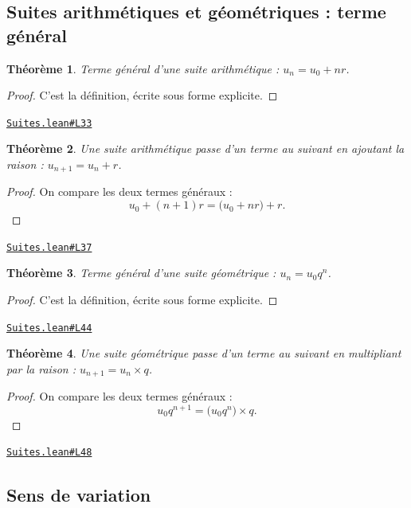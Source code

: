 \documentclass[11pt,a4paper]{article}
\theoremstyle{definition}
\theoremstyle{plain}
\newtheorem{theoreme}{Théorème}
\newcommand{\source}[2]{\par\smallskip\noindent\hfill{\footnotesize\href{#1}{\texttt{#2}}}\par\smallskip}
\begin{document}
\subsection{Suites arithmétiques et géométriques : terme général}

\begin{theoreme}
Terme général d'une suite arithmétique : $u_n = u_0 + nr$.
\end{theoreme}

\begin{proof}
C'est la définition, écrite sous forme explicite.
\end{proof}
\source{https://github.com/Commutator-IO/learn-lean/blob/main/courses/02-lycee/03-suites/Suites.lean\#L33}{Suites.lean\#L33}

\begin{theoreme}
Une suite arithmétique passe d'un terme au suivant en ajoutant la raison :
$u_{n+1} = u_n + r$.
\end{theoreme}

\begin{proof}
On compare les deux termes généraux :
\[ u_0 + (n+1)r = \bigl(u_0 + nr\bigr) + r . \]
\end{proof}
\source{https://github.com/Commutator-IO/learn-lean/blob/main/courses/02-lycee/03-suites/Suites.lean\#L37}{Suites.lean\#L37}

\begin{theoreme}
Terme général d'une suite géométrique : $u_n = u_0 q^n$.
\end{theoreme}

\begin{proof}
C'est la définition, écrite sous forme explicite.
\end{proof}
\source{https://github.com/Commutator-IO/learn-lean/blob/main/courses/02-lycee/03-suites/Suites.lean\#L44}{Suites.lean\#L44}

\begin{theoreme}
Une suite géométrique passe d'un terme au suivant en multipliant par la raison :
$u_{n+1} = u_n \times q$.
\end{theoreme}

\begin{proof}
On compare les deux termes généraux :
\[ u_0 q^{n+1} = \bigl(u_0 q^n\bigr) \times q . \]
\end{proof}
\source{https://github.com/Commutator-IO/learn-lean/blob/main/courses/02-lycee/03-suites/Suites.lean\#L48}{Suites.lean\#L48}

\subsection{Sens de variation}
\end{document}
